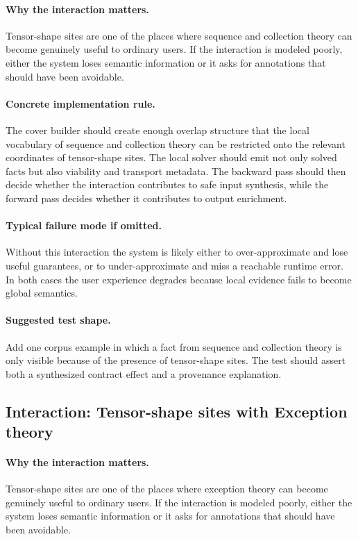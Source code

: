\documentclass[11pt]{report}
\theoremstyle{definition}
\theoremstyle{plain}
\begin{document}
\paragraph{Why the interaction matters.}
Tensor-shape sites are one of the places where sequence and collection theory can become
genuinely useful to ordinary users. If the interaction is modeled poorly,
either the system loses semantic information or it asks for annotations that
should have been avoidable.

\paragraph{Concrete implementation rule.}
The cover builder should create enough overlap structure that the local
vocabulary of sequence and collection theory can be restricted onto the relevant
coordinates of tensor-shape sites. The local solver should emit not only
solved facts but also viability and transport metadata. The backward pass
should then decide whether the interaction contributes to safe input
synthesis, while the forward pass decides whether it contributes to output
enrichment.

\paragraph{Typical failure mode if omitted.}
Without this interaction the system is likely either to over-approximate and
lose useful guarantees, or to under-approximate and miss a reachable runtime
error. In both cases the user experience degrades because local evidence
fails to become global semantics.

\paragraph{Suggested test shape.}
Add one corpus example in which a fact from sequence and collection theory is only
visible because of the presence of tensor-shape sites. The test should
assert both a synthesized contract effect and a provenance explanation.

\subsection{Interaction: Tensor-shape sites with Exception theory}

\paragraph{Why the interaction matters.}
Tensor-shape sites are one of the places where exception theory can become
genuinely useful to ordinary users. If the interaction is modeled poorly,
either the system loses semantic information or it asks for annotations that
should have been avoidable.
\end{document}
